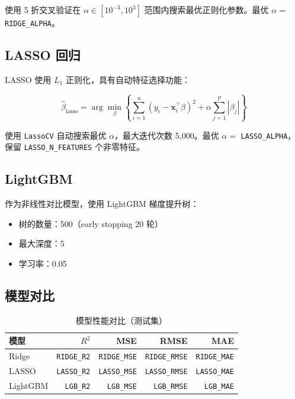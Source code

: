 \documentclass[12pt,a4paper]{ctexart}
\begin{document}
使用 5 折交叉验证在 $\alpha \in [10^{-3}, 10^3]$ 范围内搜索最优正则化参数。最优 $\alpha =$ \texttt{RIDGE\_ALPHA}。

\subsection{LASSO 回归}

LASSO 使用 $L_1$ 正则化，具有自动特征选择功能：

\begin{equation}
    \hat{\beta}_{\text{lasso}} = \arg\min_{\beta} \left\{ \sum_{i=1}^{n}(y_i - \mathbf{x}_i^\top \beta)^2 + \alpha \sum_{j=1}^{p}|\beta_j| \right\}
\end{equation}

使用 \texttt{LassoCV} 自动搜索最优 $\alpha$，最大迭代次数 5,000。最优 $\alpha =$ \texttt{LASSO\_ALPHA}，保留 \texttt{LASSO\_N\_FEATURES} 个非零特征。

\subsection{LightGBM}

作为非线性对比模型，使用 LightGBM 梯度提升树：

\begin{itemize}
    \item 树的数量：500（early stopping 20 轮）
    \item 最大深度：5
    \item 学习率：0.05
\end{itemize}

\subsection{模型对比}

\begin{table}[H]
    \centering
    \caption{模型性能对比（测试集）}
    \begin{tabular}{@{}lrrrr@{}}
        \toprule
        \textbf{模型} & \textbf{$R^2$} & \textbf{MSE} & \textbf{RMSE} & \textbf{MAE} \\
        \midrule
        Ridge & \texttt{RIDGE\_R2} & \texttt{RIDGE\_MSE} & \texttt{RIDGE\_RMSE} & \texttt{RIDGE\_MAE} \\
        LASSO & \texttt{LASSO\_R2} & \texttt{LASSO\_MSE} & \texttt{LASSO\_RMSE} & \texttt{LASSO\_MAE} \\
        LightGBM & \texttt{LGB\_R2} & \texttt{LGB\_MSE} & \texttt{LGB\_RMSE} & \texttt{LGB\_MAE} \\
        \bottomrule
    \end{tabular}
\end{table}
\end{document}
